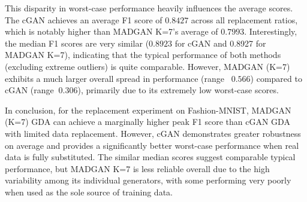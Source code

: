 This disparity in worst-case performance heavily influences the average scores. The cGAN achieves an average F1 score of $0.8427$ across all replacement ratios, which is notably higher than MADGAN K=7's average of $0.7993$. Interestingly, the median F1 scores are very similar ($0.8923$ for cGAN and 0.8927 for MADGAN K=7), indicating that the typical performance of both methods (excluding extreme outliers) is quite comparable. However, MADGAN (K=7) exhibits a much larger overall spread in performance (range ~$0.566$) compared to cGAN (range $~0.306$), primarily due to its extremely low worst-case scores.

In conclusion, for the replacement experiment on Fashion-MNIST, MADGAN (K=7) GDA can achieve a marginally higher peak F1 score than cGAN GDA with limited data replacement. However, cGAN demonstrates greater robustness on average and provides a significantly better worst-case performance when real data is fully substituted. The similar median scores suggest comparable typical performance, but MADGAN K=7 is less reliable overall due to the high variability among its individual generators, with some performing very poorly when used as the sole source of training data.

